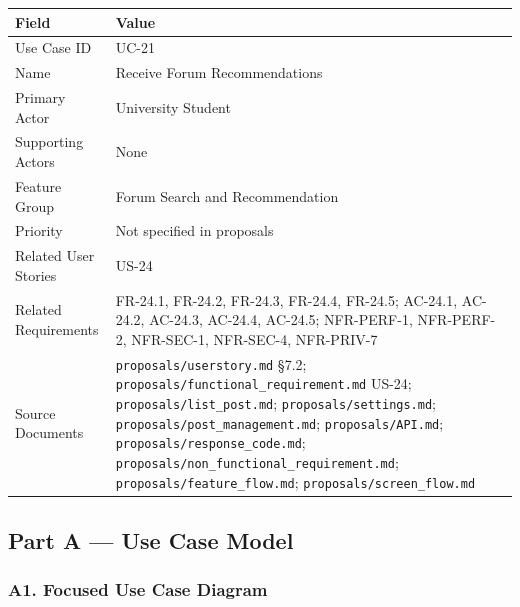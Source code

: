 \documentclass[12pt]{article}
\renewcommand{\baselinestretch}{1.5}
\begin{document}
\begingroup
\small
\renewcommand{\baselinestretch}{1.0}\selectfont
\renewcommand{\arraystretch}{1.15}
\setlength{\tabcolsep}{6pt}
\begin{longtable}{|>{\raggedright\arraybackslash}p{}|>{\raggedright\arraybackslash}p{}|}
\hline
\textbf{Field} & \textbf{Value} \\ \hline
\endhead
Use Case ID & UC-21 \\ \hline
Name & Receive Forum Recommendations \\ \hline
Primary Actor & University Student \\ \hline
Supporting Actors & None \\ \hline
Feature Group & Forum Search and Recommendation \\ \hline
Priority & Not specified in proposals \\ \hline
Related User Stories & US-24 \\ \hline
Related Requirements & FR-24.1, FR-24.2, FR-24.3, FR-24.4, FR-24.5; AC-24.1, AC-24.2, AC-24.3, AC-24.4, AC-24.5; NFR-PERF-1, NFR-PERF-2, NFR-SEC-1, NFR-SEC-4, NFR-PRIV-7 \\ \hline
Source Documents & \texttt{proposals/userstory.md} §7.2; \texttt{proposals/functional\_requirement.md} US-24; \texttt{proposals/list\_post.md}; \texttt{proposals/settings.md}; \texttt{proposals/post\_management.md}; \texttt{proposals/API.md}; \texttt{proposals/response\_code.md}; \texttt{proposals/non\_functional\_requirement.md}; \texttt{proposals/feature\_flow.md}; \texttt{proposals/screen\_flow.md} \\ \hline
\end{longtable}
\endgroup
\par\medskip

\hypertarget{sec:part-a-use-case-model}{}
\subsection*{Part A --- Use Case Model}
\par\medskip

\hypertarget{sec:a1-focused-use-case-diagram}{}
\subsubsection*{A1. Focused Use Case Diagram}
\par\medskip
\end{document}
